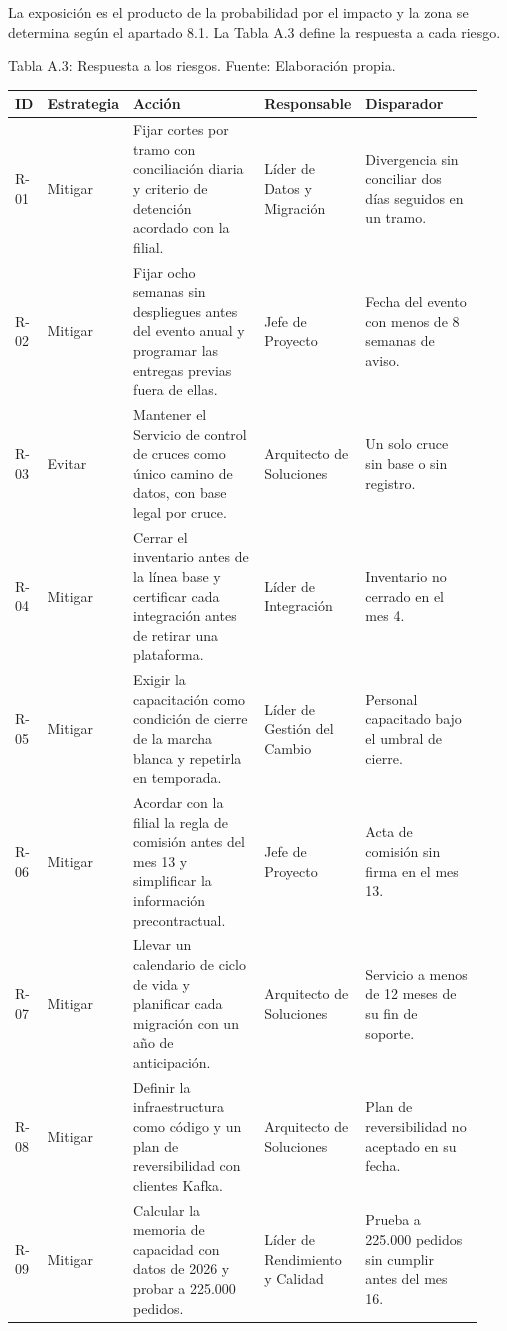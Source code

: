 \documentclass[11pt]{article}
\begin{document}
La exposición es el producto de la probabilidad por el impacto y la zona se determina según el apartado 8.1. La Tabla A.3 define la respuesta a cada riesgo.

Tabla A.3: Respuesta a los riesgos. Fuente: Elaboración propia.

\begin{longtable}{p{0.065\linewidth}p{0.102\linewidth}p{0.316\linewidth}p{0.158\linewidth}p{0.288\linewidth}}
\toprule
\textbf{ID} & \textbf{Estrategia} & \textbf{Acción} & \textbf{Responsable} & \textbf{Disparador} \\
\midrule
\endhead
\bottomrule
\endlastfoot
R-01 & Mitigar & Fijar cortes por tramo con conciliación diaria y criterio de detención acordado con la filial. & Líder de Datos y Migración & Divergencia sin conciliar dos días seguidos en un tramo. \\
R-02 & Mitigar & Fijar ocho semanas sin despliegues antes del evento anual y programar las entregas previas fuera de ellas. & Jefe de Proyecto & Fecha del evento con menos de 8 semanas de aviso. \\
R-03 & Evitar & Mantener el Servicio de control de cruces como único camino de datos, con base legal por cruce. & Arquitecto de Soluciones & Un solo cruce sin base o sin registro. \\
R-04 & Mitigar & Cerrar el inventario antes de la línea base y certificar cada integración antes de retirar una plataforma. & Líder de Integración & Inventario no cerrado en el mes 4. \\
R-05 & Mitigar & Exigir la capacitación como condición de cierre de la marcha blanca y repetirla en temporada. & Líder de Gestión del Cambio & Personal capacitado bajo el umbral de cierre. \\
R-06 & Mitigar & Acordar con la filial la regla de comisión antes del mes 13 y simplificar la información precontractual. & Jefe de Proyecto & Acta de comisión sin firma en el mes 13. \\
R-07 & Mitigar & Llevar un calendario de ciclo de vida y planificar cada migración con un año de anticipación. & Arquitecto de Soluciones & Servicio a menos de 12 meses de su fin de soporte. \\
R-08 & Mitigar & Definir la infraestructura como código y un plan de reversibilidad con clientes Kafka. & Arquitecto de Soluciones & Plan de reversibilidad no aceptado en su fecha. \\
R-09 & Mitigar & Calcular la memoria de capacidad con datos de 2026 y probar a 225.000 pedidos. & Líder de Rendimiento y Calidad & Prueba a 225.000 pedidos sin cumplir antes del mes 16. \\

\end{longtable}
\end{document}
